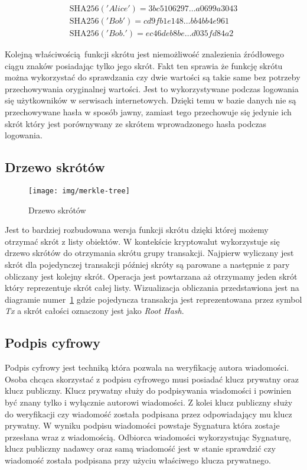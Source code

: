 \documentclass[journal,12pt,onecolumn,draftclsnofoot,]{IEEEtran}
\begin{document}
\begin{gather}
\text{SHA256} ('Alice') = 3bc5106297 \ldots a0699a3043 \\
\text{SHA256} ('Bob') = cd9fb1e148 \ldots bb4bb4e961 \\
\text{SHA256} ('Bob.') = ec46deb8be \ldots d035fd84a2
\end{gather}

Kolejną właściwością funkcji skrótu jest niemożliwość znalezienia źródłowego ciągu znaków posiadając tylko jego skrót.
Fakt ten sprawia że funkcję skrótu można wykorzystać do sprawdzania czy dwie wartości są takie same bez potrzeby przechowywania
oryginalnej wartości. Jest to wykorzystywane podczas logowania się użytkowników w serwisach internetowych. Dzięki temu
w bazie danych nie są przechowywane hasła w sposób jawny, zamiast tego przechowuje się jedynie ich skrót który jest
porównywany ze skrótem wprowadzonego hasła podczas logowania.

\subsection{Drzewo skrótów}

\begin{figure}[!t]
  \centering
  \texttt{[image: img/merkle-tree]}
  \caption{Drzewo skrótów}
  \label{fig:merkle}
\end{figure}

Jest to bardziej rozbudowana wersja funkcji skrótu dzięki której możemy otrzymać skrót z listy obiektów. W kontekście
kryptowalut wykorzystuje się drzewo skrótów do otrzymania skrótu grupy transakcji. Najpierw wyliczany jest skrót dla
pojedynczej transakcji później skróty są parowane a następnie z pary obliczany jest kolejny skrót. Operacja jest
powtarzana aż otrzymamy jeden skrót który reprezentuje skrót całej listy. Wizualizacja obliczania przedstawiona jest na
diagramie numer~\ref{fig:merkle} gdzie pojedyncza transakcja jest reprezentowana przez symbol \textit{Tx} a skrót
całości oznaczony jest jako \textit{Root Hash}.

\subsection{Podpis cyfrowy}

Podpis cyfrowy jest techniką która pozwala na weryfikację autora wiadomości. Osoba chcąca skorzystać z podpisu cyfrowego
musi posiadać klucz prywatny oraz klucz publiczny. Klucz prywatny służy do podpisywania wiadomości i powinien być znany
tylko i wyłącznie autorowi wiadomości. Z kolei klucz publiczny służy do weryfikacji czy wiadomość została podpisana
przez odpowiadający mu klucz prywatny. W wyniku podpisu wiadomości powstaje Sygnatura która zostaje przesłana wraz z
wiadomością. Odbiorca wiadomości wykorzystując Sygnaturę, klucz publiczny nadawcy oraz samą wiadomość jest w stanie
sprawdzić czy wiadomość została podpisana przy użyciu właściwego klucza prywatnego.
\end{document}
